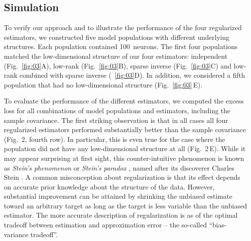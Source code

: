 \subsection*{Simulation}

To verify our approach and to illustrate the performance of the four regularized estimators, we constructed five model populations with different underlying structures. Each population contained 100~neurons. The first four populations matched the low-dimensional structure of our four estimators: independent (Fig.~\ref{fig:03}A), low-rank (Fig.~\ref{fig:03}B), sparse inverse (Fig.~\ref{fig:03}C) and low-rank combined with sparse inverse (~\ref{fig:03}D).  In addition, we considered a fifth population that had no low-dimensional structure (Fig.~\ref{fig:03}\,E).



To evaluate the performance of the different estimators, we computed the excess loss for all combinations of model populations and estimators, including the sample covariance. The first striking observation is that in all cases all four regularized estimators performed substantially better than the sample covariance (Fig.~2, fourth row). In particular, this is even true for the case where the population did not have any low-dimensional structure at all (Fig.~2\,E). While it may appear surprising at first sight, this counter-intuitive phenomenon is known as \emph{Stein's phenomenon} or \emph{Stein's paradox} \cite{Efron:1977}, named after its discoverer Charles Stein \cite{Stein:1956}. A common misconception about regularization is that its effect depends on accurate prior knowledge about the structure of the data. However, substantial improvement can be attained by shrinking the unbiased estimate toward an arbitrary target as long as the target is less variable than the unbiased estimator. The more accurate description of regularization is as of the optimal tradeoff between estimation and approximation error -- the so-called ``bias-variance tradeoff''.

